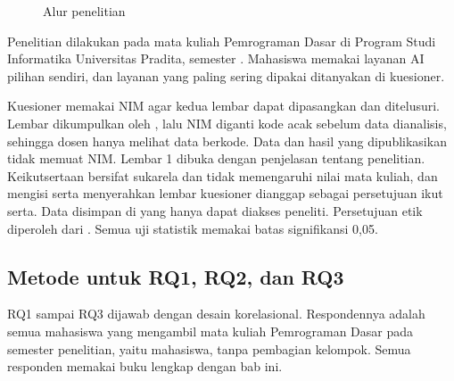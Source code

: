 \begin{figure}[H]
  \centering
  \caption{Alur penelitian}
  \label{fig:b16-alur}
\end{figure}

Penelitian dilakukan pada mata kuliah Pemrograman Dasar di Program Studi Informatika Universitas Pradita, semester . Mahasiswa memakai layanan AI pilihan sendiri, dan layanan yang paling sering dipakai ditanyakan di kuesioner.

Kuesioner memakai NIM agar kedua lembar dapat dipasangkan dan ditelusuri. Lembar dikumpulkan oleh , lalu NIM diganti kode acak sebelum data dianalisis, sehingga dosen hanya melihat data berkode. Data dan hasil yang dipublikasikan tidak memuat NIM. Lembar 1 dibuka dengan penjelasan tentang penelitian. Keikutsertaan bersifat sukarela dan tidak memengaruhi nilai mata kuliah, dan mengisi serta menyerahkan lembar kuesioner dianggap sebagai persetujuan ikut serta. Data disimpan di  yang hanya dapat diakses peneliti. Persetujuan etik diperoleh dari . Semua uji statistik memakai batas signifikansi 0,05.

\subsection{Metode untuk RQ1, RQ2, dan RQ3}
\label{sec:b16-metode-survei}

RQ1 sampai RQ3 dijawab dengan desain korelasional. Respondennya adalah semua mahasiswa yang mengambil mata kuliah Pemrograman Dasar pada semester penelitian, yaitu  mahasiswa, tanpa pembagian kelompok. Semua responden memakai buku lengkap dengan bab ini.

